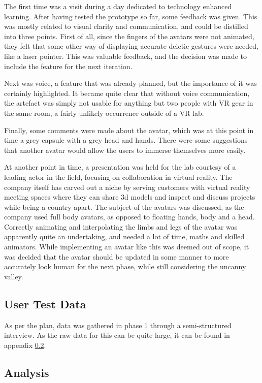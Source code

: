 The first time was a visit during a day dedicated to technology enhanced learning. After having tested the prototype so far, some feedback was given. This was mostly related to visual clarity and communication, and could be distilled into three points. First of all, since the fingers of the avatars were not animated, they felt that some other way of displaying accurate deictic gestures were needed, like a laser pointer. This was valuable feedback, and the decision was made to include the feature for the next iteration. 

Next was voice, a feature that was already planned, but the importance of it was certainly highlighted. It became quite clear that without voice communication, the artefact was simply not usable for anything but two people with VR gear in the same room, a fairly unlikely occurrence outside of a VR lab.

Finally, some comments were made about the avatar, which was at this point in time a grey capsule with a grey head and hands. There were some suggestions that another avatar would allow the users to immerse themselves more easily. 

At another point in time, a presentation was held for the lab courtesy of a leading actor in the field, focusing on collaboration in virtual reality. The company itself has carved out a niche by serving customers with virtual reality meeting spaces where they can share 3d models and inspect and discuss projects while being a country apart. The subject of the avatars was discussed, as the company used full body avatars, as opposed to floating hands, body and a head. Correctly animating and interpolating the limbs and legs of the avatar was apparently quite an undertaking, and needed a lot of time, maths and skilled animators. While implementing an avatar like this was deemed out of scope, it was decided that the avatar should be updated in some manner to more accurately look human for the next phase, while still considering the uncanny valley. 



\subsection{User Test Data}
As per the plan, data was gathered in phase 1 through a semi-structured interview. As the raw data for this can be quite large, it can be found in appendix \ref{}.


\subsection{Analysis}
